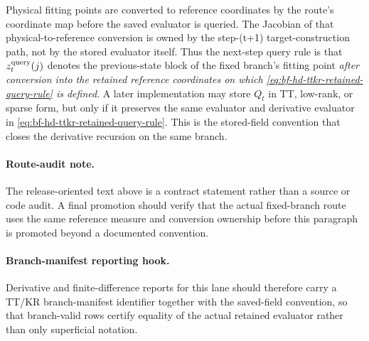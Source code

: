 Physical fitting points are converted to reference coordinates by the route's
coordinate map before the saved evaluator is queried.  The Jacobian of that
physical-to-reference conversion is owned by the step-(t+1) target-construction
path, not by the stored evaluator itself.  Thus the next-step query rule is that
\(z_t^{\rm query}(j)\) denotes the previous-state block of the fixed branch's
fitting point \emph{after conversion into the retained reference coordinates on
which \eqref{eq:bf-hd-ttkr-retained-query-rule} is defined}.  A later
implementation may store \(Q_t\) in TT, low-rank, or sparse form, but only if it
preserves the same evaluator and derivative evaluator in
\eqref{eq:bf-hd-ttkr-retained-query-rule}.  This is the stored-field convention
that closes the derivative recursion on the same branch.

\paragraph{Route-audit note.}
The release-oriented text above is a contract statement rather than a source or
code audit.  A final promotion should verify that the actual fixed-branch route
uses the same reference measure and conversion ownership before this paragraph is
promoted beyond a documented convention.

\paragraph{Branch-manifest reporting hook.}
Derivative and finite-difference reports for this lane should therefore carry a
TT/KR branch-manifest identifier together with the saved-field convention, so
that branch-valid rows certify equality of the actual retained evaluator rather
than only superficial notation.

